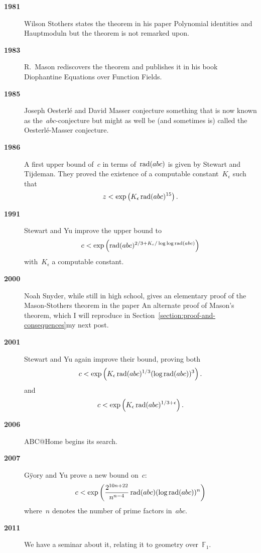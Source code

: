 \begin{description}
  \item[\textbf{1981}] Wilson Stothers states the theorem in his paper Polynomial identities and Hauptmoduln but the theorem is not remarked upon.
  \item[\textbf{1983}] R.\ Mason rediscovers the theorem and publishes it in his book Diophantine Equations over Function Fields.
  \item[\textbf{1985}] Joseph Oesterl\'e and David Masser conjecture something that is now known as the~$abc$\nobreakdash-conjecture but might as well be (and sometimes is) called the Oesterl\'e-Masser conjecture.

  \item[\textbf{1986}] A first upper bound of~$c$ in terms of~$\operatorname{rad}(abc)$ is given by Stewart and Tijdeman. They proved the existence of a computable constant~$K_{\epsilon}$ such that
    \begin{equation}
      z<\exp\left( K_{\epsilon}\operatorname{rad}(abc)^{15} \right).
    \end{equation}
  \item[\textbf{1991}] Stewart and Yu improve the upper bound to
    \begin{equation}
      c<\exp\left( \operatorname{rad}(abc)^{2/3+K_{\epsilon}/\log\log\operatorname{rad}(abc)} \right)
    \end{equation}
    with~$K_{\epsilon}$ a computable constant.
  \item[\textbf{2000}] Noah Snyder, while still in high school, gives an elementary proof of the Mason-Stothers theorem in the paper An alternate proof of Mason's theorem, which I will reproduce in \iftex Section~\ref{section:proof-and-consequences}\fi\ifblog my next post\fi.
  \item[\textbf{2001}] Stewart and Yu again improve their bound, proving both
    \begin{equation}
      c<\exp\left( K_{\epsilon}\operatorname{rad}(abc)^{1/3}(\log\operatorname{rad}(abc))^3 \right).
    \end{equation}
    and
    \begin{equation}
      c<\exp\left( K_{\epsilon}\operatorname{rad}(abc)^{1/3+\epsilon} \right).
    \end{equation}
  \item[\textbf{2006}] ABC@Home begins its search.

  \item[\textbf{2007}] G\"yory and Yu prove a new bound on~$c$:
    \begin{equation}
      c<\exp\left( \frac{2^{10n+22}}{n^{n-4}}\operatorname{rad}(abc)(\log\operatorname{rad}(abc))^n \right)
    \end{equation}
    where~$n$ denotes the number of prime factors in~$abc$.
  \item[\textbf{2011}] We have a seminar about it, relating it to geometry over~$\mathbb{F}_1$.
\end{description}
